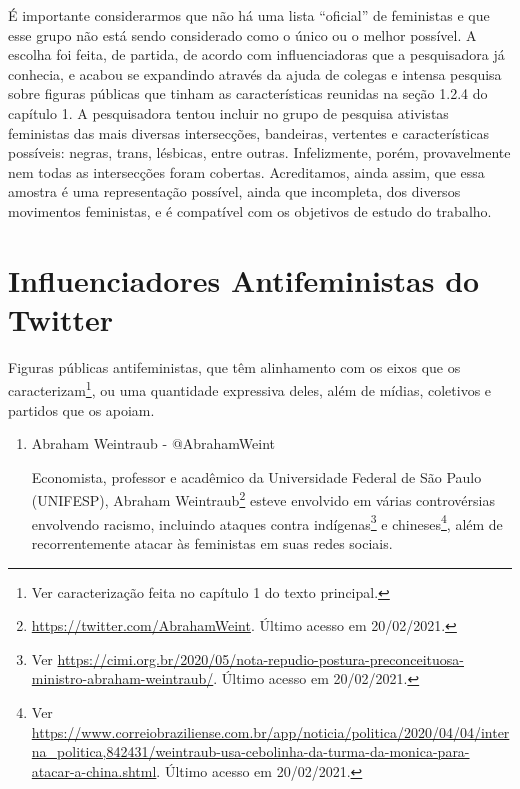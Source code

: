 \documentclass[
	12pt,				%
	openright,			%
	twoside,			%
	a4paper,			%
	english,			%
	brazil				%
	]{abntex2}
\begin{document}
\begin{anexosenv}
 É importante considerarmos que não há uma lista ``oficial'' de feministas e que esse grupo não está sendo considerado como o único ou o melhor possível. A escolha foi feita, de partida, de acordo com influenciadoras que a pesquisadora já conhecia, e acabou se expandindo através da ajuda de colegas e intensa pesquisa sobre figuras públicas que tinham as características reunidas na seção 1.2.4 do capítulo 1. A pesquisadora tentou incluir no grupo de pesquisa ativistas feministas das mais diversas intersecções, bandeiras, vertentes e características possíveis: negras, trans, lésbicas, entre outras. Infelizmente, porém, provavelmente nem todas as intersecções foram cobertas. Acreditamos, ainda assim, que essa amostra é uma representação possível, ainda que incompleta, dos diversos movimentos feministas, e é compatível com os objetivos de estudo do trabalho.
 
 \newpage
 
 \section*{Influenciadores Antifeministas do Twitter}
 Figuras públicas antifeministas, que têm alinhamento com os eixos que os caracterizam\footnote{Ver caracterização feita no capítulo 1 do texto principal.}, ou uma quantidade expressiva deles, além de mídias, coletivos e partidos que os apoiam.
 
  
\begin{enumerate}

 \subsection*{Pessoas Públicas}
 \item Abraham Weintraub - @AbrahamWeint\label{abweint}
 
 Economista, professor e acadêmico da Universidade Federal de São Paulo (UNIFESP), Abraham Weintraub\footnote{\url{https://twitter.com/AbrahamWeint}. Último acesso em 20/02/2021.} esteve envolvido em várias controvérsias envolvendo racismo, incluindo ataques contra indígenas\footnote{Ver \url{https://cimi.org.br/2020/05/nota-repudio-postura-preconceituosa-ministro-abraham-weintraub/}. Último acesso em 20/02/2021.} e chineses\footnote{Ver \url{https://www.correiobraziliense.com.br/app/noticia/politica/2020/04/04/interna_politica,842431/weintraub-usa-cebolinha-da-turma-da-monica-para-atacar-a-china.shtml}. Último acesso em 20/02/2021.}, além de recorrentemente atacar às feministas em suas redes sociais.
 

\end{enumerate}
\end{anexosenv}
\end{document}
